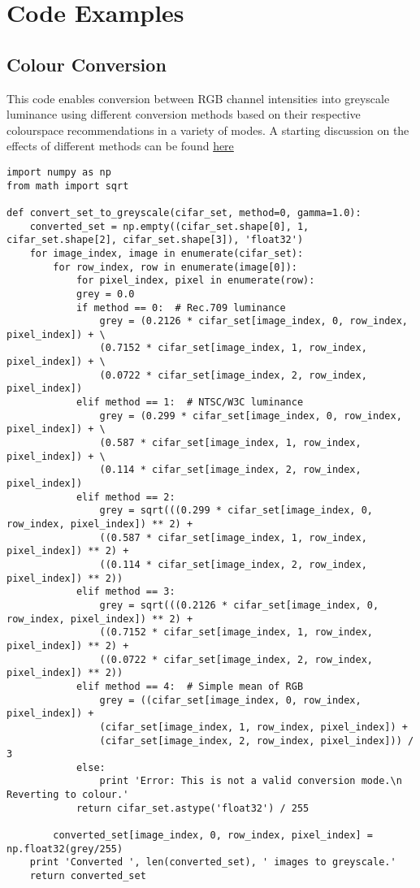 \chapter{Code Examples}

\section{Colour Conversion}

This code enables conversion between RGB channel intensities into greyscale luminance using different conversion methods based on their respective colourspace recommendations in a variety of modes. A starting discussion on the effects of different methods can be found \hyperlink{http://cadik.posvete.cz/color_to_gray_evaluation/}{here}

\begin{lstlisting}
import numpy as np
from math import sqrt

def convert_set_to_greyscale(cifar_set, method=0, gamma=1.0):
	converted_set = np.empty((cifar_set.shape[0], 1, cifar_set.shape[2], cifar_set.shape[3]), 'float32')
	for image_index, image in enumerate(cifar_set):
		for row_index, row in enumerate(image[0]):
			for pixel_index, pixel in enumerate(row):
			grey = 0.0
			if method == 0:  # Rec.709 luminance
				grey = (0.2126 * cifar_set[image_index, 0, row_index, pixel_index]) + \
				(0.7152 * cifar_set[image_index, 1, row_index, pixel_index]) + \
				(0.0722 * cifar_set[image_index, 2, row_index, pixel_index])
			elif method == 1:  # NTSC/W3C luminance
				grey = (0.299 * cifar_set[image_index, 0, row_index, pixel_index]) + \
				(0.587 * cifar_set[image_index, 1, row_index, pixel_index]) + \
				(0.114 * cifar_set[image_index, 2, row_index, pixel_index])
			elif method == 2:
				grey = sqrt(((0.299 * cifar_set[image_index, 0, row_index, pixel_index]) ** 2) +
				((0.587 * cifar_set[image_index, 1, row_index, pixel_index]) ** 2) +
				((0.114 * cifar_set[image_index, 2, row_index, pixel_index]) ** 2))
			elif method == 3:
				grey = sqrt(((0.2126 * cifar_set[image_index, 0, row_index, pixel_index]) ** 2) +
				((0.7152 * cifar_set[image_index, 1, row_index, pixel_index]) ** 2) +
				((0.0722 * cifar_set[image_index, 2, row_index, pixel_index]) ** 2))
			elif method == 4:  # Simple mean of RGB
				grey = ((cifar_set[image_index, 0, row_index, pixel_index]) +
				(cifar_set[image_index, 1, row_index, pixel_index]) +
				(cifar_set[image_index, 2, row_index, pixel_index])) / 3
			else:
				print 'Error: This is not a valid conversion mode.\n Reverting to colour.'
			return cifar_set.astype('float32') / 255
		
		converted_set[image_index, 0, row_index, pixel_index] = np.float32(grey/255)
	print 'Converted ', len(converted_set), ' images to greyscale.'
	return converted_set
 
\end{lstlisting}
